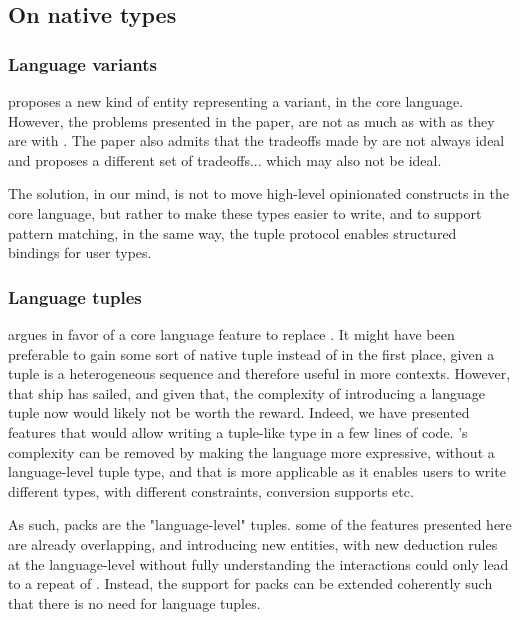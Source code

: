 \documentclass{wg21}
\begin{document}
\subsection{On native types}

\subsubsection{Language variants}

 proposes a new kind of entity representing a variant, in the core language.
However, the problems presented in the paper, are not as much as with  as they are with .
The paper also admits that the tradeoffs made by  are not always ideal and proposes a different set of tradeoffs... which may also not be ideal.

The solution, in our mind, is not to move high-level opinionated constructs in the core language, but rather to make these types easier to write,
and to support pattern matching, in the same way, the tuple protocol enables structured bindings for user types.

\subsubsection{Language tuples}

 argues in favor of a core language feature to replace .
It might have been preferable to gain some sort of native tuple instead of  in the first place, given a tuple is a heterogeneous sequence and therefore useful in more contexts.
However, that ship has sailed, and given that, the complexity of introducing a language tuple now would likely not be worth the reward.
Indeed, we have presented features that would allow writing a tuple-like type in a few lines of code. 's complexity can be removed by making the language more expressive, without a language-level tuple type, and that is more applicable as it enables users to write different  types, with different constraints,
conversion supports etc.

As such, packs are the "language-level" tuples. some of the features presented here are already overlapping, and introducing new entities, with new deduction rules at the language-level without fully understanding the interactions could only
lead to a repeat of . Instead, the support for packs can be extended coherently such that there is no need for language tuples.
\end{document}
